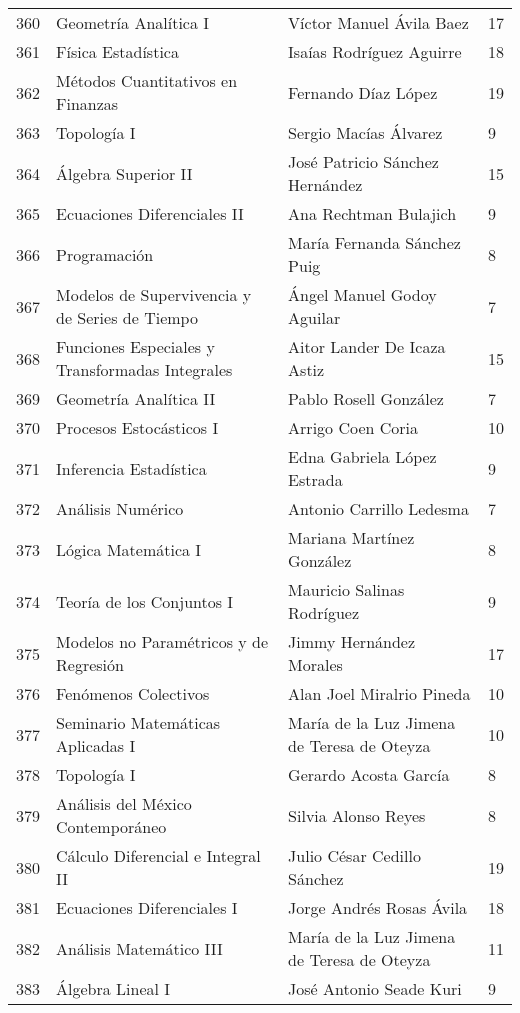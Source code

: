 \begin{table}[ht]
\begin{tabular}{rlll}
  360 & Geometría Analítica I & Víctor Manuel Ávila Baez & 17 \\ 
  361 & Física Estadística & Isaías Rodríguez Aguirre & 18 \\ 
  362 & Métodos Cuantitativos en Finanzas & Fernando Díaz López & 19 \\ 
  363 & Topología I & Sergio Macías Álvarez & 9 \\ 
  364 & Álgebra Superior II & José Patricio Sánchez Hernández & 15 \\ 
  365 & Ecuaciones Diferenciales II & Ana Rechtman Bulajich & 9 \\ 
  366 & Programación & María Fernanda Sánchez Puig & 8 \\ 
  367 & Modelos de Supervivencia y de Series de Tiempo & Ángel Manuel Godoy Aguilar & 7 \\ 
  368 & Funciones Especiales y Transformadas Integrales & Aitor Lander De Icaza Astiz & 15 \\ 
  369 & Geometría Analítica II & Pablo Rosell González & 7 \\ 
  370 & Procesos Estocásticos I & Arrigo Coen Coria & 10 \\ 
  371 & Inferencia Estadística & Edna Gabriela López Estrada & 9 \\ 
  372 & Análisis Numérico & Antonio Carrillo Ledesma & 7 \\ 
  373 & Lógica Matemática I & Mariana Martínez González & 8 \\ 
  374 & Teoría de los Conjuntos I & Mauricio Salinas Rodríguez & 9 \\ 
  375 & Modelos no Paramétricos y de Regresión & Jimmy Hernández Morales & 17 \\ 
  376 & Fenómenos Colectivos & Alan Joel Miralrio Pineda & 10 \\ 
  377 & Seminario Matemáticas Aplicadas I & María de la Luz Jimena de Teresa de Oteyza & 10 \\ 
  378 & Topología I & Gerardo Acosta García & 8 \\ 
  379 & Análisis del México Contemporáneo & Silvia Alonso Reyes & 8 \\ 
  380 & Cálculo Diferencial e Integral II & Julio César Cedillo Sánchez & 19 \\ 
  381 & Ecuaciones Diferenciales I & Jorge Andrés Rosas Ávila & 18 \\ 
  382 & Análisis Matemático III & María de la Luz Jimena de Teresa de Oteyza & 11 \\ 
  383 & Álgebra Lineal I & José Antonio Seade Kuri & 9 \\ 

\end{tabular}
\end{table}

